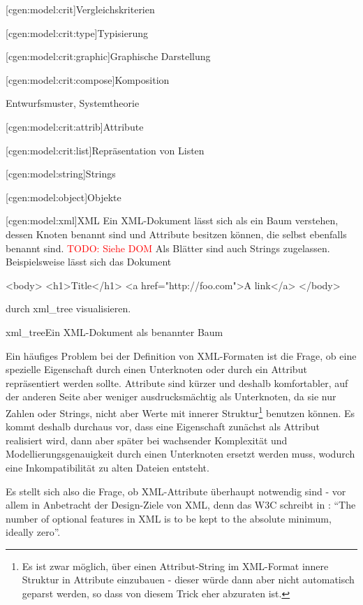 \documentclass[a4paper, bibgerm]{book}
\newcommand{\todo}[1]{
  \textcolor{red}{TODO: #1}
}
\newcommand\lsubsection{}
\newcommand\lsubsubsection{}
\newcommand\abb{}
\newcommand\fig{}
\begin{document}
\lsubsection[cgen:model:crit]{Vergleichskriterien}

\lsubsubsection[cgen:model:crit:type]{Typisierung}

\lsubsubsection[cgen:model:crit:graphic]{Graphische Darstellung}

\lsubsubsection[cgen:model:crit:compose]{Komposition}

Entwurfsmuster, Systemtheorie

\lsubsubsection[cgen:model:crit:attrib]{Attribute}

\lsubsubsection[cgen:model:crit:list]{Repräsentation von Listen}

\lsubsection[cgen:model:string]{Strings}

\lsubsection[cgen:model:object]{Objekte}

\lsubsection[cgen:model:xml]{XML} 
Ein XML-Dokument lässt sich als ein Baum
verstehen, dessen Knoten benannt sind und Attribute besitzen können, die
selbst ebenfalls benannt sind. \todo{Siehe DOM} Als Blätter sind auch Strings
zugelassen. Beispielsweise lässt sich das Dokument
\begin{code}
<body>
  <h1>Title</h1>
  <a href="http://foo.com">A link</a>
</body>  
\end{code} %
durch \abb{xml_tree} visualisieren.

\fig{xml_tree}{Ein XML-Dokument als benannter Baum}

Ein häufiges Problem bei der Definition von XML-Formaten ist die Frage,
ob eine spezielle Eigenschaft durch einen Unterknoten oder durch ein
Attribut repräsentiert werden sollte. Attribute sind kürzer und deshalb
komfortabler, auf der anderen Seite aber weniger ausdrucksmächtig als
Unterknoten, da sie nur Zahlen oder Strings, nicht aber Werte mit
innerer Struktur\footnote{Es ist zwar möglich, über einen
  Attribut-String im XML-Format innere Struktur in Attribute einzubauen
  - dieser würde dann aber nicht automatisch geparst werden, so dass von
  diesem Trick eher abzuraten ist.} benutzen können. Es kommt deshalb
durchaus vor, dass eine Eigenschaft zunächst als Attribut realisiert
wird, dann aber später bei wachsender Komplexität und
Modellierungsgenauigkeit durch einen Unterknoten ersetzt werden muss,
wodurch eine Inkompatibilität zu alten Dateien entsteht.

Es stellt sich also die Frage, ob XML-Attribute überhaupt notwendig sind
- vor allem in Anbetracht der Design-Ziele von XML, denn das W3C
schreibt in \cite{rec_xml}: "`The number of optional features in XML is to
be kept to the absolute minimum, ideally zero"'. 
\end{document}
